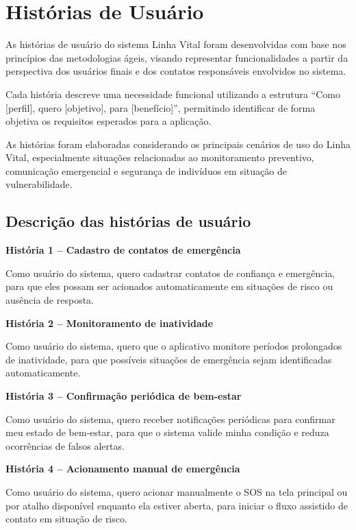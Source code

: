 \section{Histórias de Usuário}

As histórias de usuário do sistema Linha Vital foram desenvolvidas com base nos princípios das metodologias ágeis, visando representar funcionalidades a partir da perspectiva dos usuários finais e dos contatos responsáveis envolvidos no sistema.

Cada história descreve uma necessidade funcional utilizando a estrutura “Como [perfil], quero [objetivo], para [benefício]”, permitindo identificar de forma objetiva os requisitos esperados para a aplicação.

As histórias foram elaboradas considerando os principais cenários de uso do Linha Vital, especialmente situações relacionadas ao monitoramento preventivo, comunicação emergencial e segurança de indivíduos em situação de vulnerabilidade.

\subsection{Descrição das histórias de usuário}

\textbf{História 1 – Cadastro de contatos de emergência}

Como usuário do sistema, quero cadastrar contatos de confiança e emergência, para que eles possam ser acionados automaticamente em situações de risco ou ausência de resposta.

\bigskip

\textbf{História 2 – Monitoramento de inatividade}

Como usuário do sistema, quero que o aplicativo monitore períodos prolongados de inatividade, para que possíveis situações de emergência sejam identificadas automaticamente.

\bigskip

\textbf{História 3 – Confirmação periódica de bem-estar}

Como usuário do sistema, quero receber notificações periódicas para confirmar meu estado de bem-estar, para que o sistema valide minha condição e reduza ocorrências de falsos alertas.

\bigskip

\textbf{História 4 – Acionamento manual de emergência}

Como usuário do sistema, quero acionar manualmente o SOS na tela principal ou por atalho disponível enquanto ela estiver aberta, para iniciar o fluxo assistido de contato em situação de risco.

